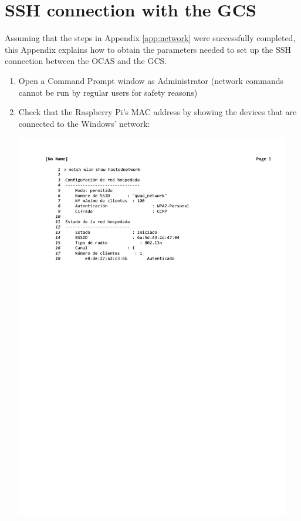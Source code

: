 
\chapter{SSH connection with the GCS} \label{app:ssh}

Assuming that the steps in Appendix \ref{app:network} were successfully completed, this Appendix explains how to obtain the parameters needed to set up the SSH connection between the OCAS and the GCS.

\begin{enumerate}
	\item Open a Command Prompt window as Administrator (network commands cannot be run by regular users for safety reasons)

	\item Check that the Raspberry Pi's MAC address by showing the devices that are connected to the Windows' network:

		\hspace{0.05\textwidth}\includegraphics[width=0.95\textwidth,clip,trim={3.5cm 20cm 0 2.3cm}]{./files/shownetwork.pdf}


\end{enumerate}
